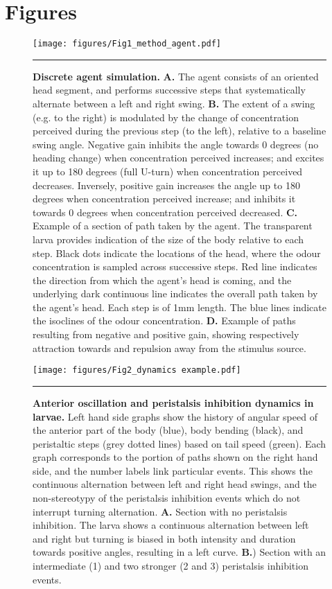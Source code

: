 \documentclass[10pt,a4paper]{article}
\begin{document}
\section{Figures}
\begin{figure}[!ht]
\begin{center}
\texttt{[image: figures/Fig1\_method\_agent.pdf]}
\caption{
{\bf Discrete agent simulation.} {\bf A.} The agent consists of an oriented head segment, and performs successive steps that systematically alternate between a left and right swing. {\bf B.} The extent of a swing (e.g. to the right) is modulated by the change of concentration perceived during the previous step (to the left), relative to a baseline swing angle. Negative gain inhibits the angle towards 0 degrees (no heading change) when concentration perceived increases; and excites it up to 180 degrees (full U-turn) when concentration perceived decreases. Inversely, positive gain increases the angle up to 180 degrees when concentration perceived increase; and inhibits it towards 0 degrees when concentration perceived decreased.
{\bf C.} Example of a section of path taken by the agent. The transparent larva provides indication of the size of the body relative to each step. Black dots indicate the locations of the head, where the odour concentration is sampled across successive steps. Red line indicates the direction from which the agent’s head is coming, and the underlying dark continuous line indicates the overall path taken by the agent’s head. Each step is of 1mm length. The blue lines indicate the isoclines of the odour concentration.
{\bf D.} Example of paths resulting from negative and positive gain, showing respectively attraction towards and repulsion away from the stimulus source.
\label{fig:Fig1}}
\hrule
\end{center}
\end{figure}

\begin{figure}[!ht]
\begin{center}
\texttt{[image: figures/Fig2\_dynamics example.pdf]}
\caption{{\bf Anterior oscillation and peristalsis inhibition dynamics in larvae.} 
Left hand side graphs show the history of angular speed of the anterior part of the body (blue), body bending (black), and peristaltic steps (grey dotted lines) based on tail speed (green). Each graph corresponds to the portion of paths shown on the right hand side, and the number labels link particular events. This shows the continuous alternation between left and right head swings, and the non-stereotypy of the peristalsis inhibition events which do not interrupt turning alternation.
{\bf A.} Section with no peristalsis inhibition. The larva shows a continuous alternation between left and right but turning is biased in both intensity and duration towards positive angles, resulting in a left curve.
{\bf B.}) Section with an intermediate (1) and two stronger (2 and 3) peristalsis inhibition events.
\label{fig:Fig2}
}
\hrule
\end{center}
\end{figure}
\end{document}
